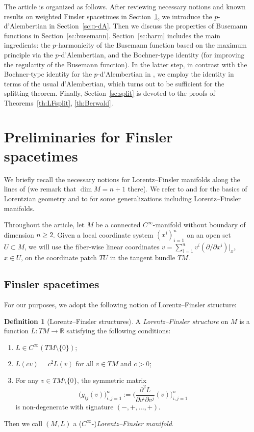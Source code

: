 \documentclass[a4paper,11pt]{article}
\numberwithin{equation}{section}
\theoremstyle{definition}
\newtheorem{definition}{Definition}[section]
\theoremstyle{plain}
\newcommand{\del}{\partial}
\newcommand{\lra}{\longrightarrow}
\newcommand{\R}{\ensuremath{\mathbb{R}}}
\begin{document}
The article is organized as follows.
After reviewing necessary notions and known results on weighted Finsler spacetimes in Section~\ref{sc:pre}, we introduce the $p$-d'Alembertian in Section~\ref{sc:p-dA}.
Then we discuss the properties of Busemann functions in Section~\ref{sc:busemann}. Section~\ref{sc:harm} includes the main ingredients: the $p$-harmonicity of the Busemann function based on the maximum principle via the $p$-d'Alembertian, and the Bochner-type identity (for improving the regularity of the Busemann function).
In the latter step, in contrast with the Bochner-type identity for the $p$-d'Alembertian in \cite{quintet}, we employ the identity in terms of the usual d'Alembertian, which turns out to be sufficient for the splitting theorem.
Finally, Section~\ref{sc:split} is devoted to the proofs of Theorems~\ref{th:LFsplit}, \ref{th:Berwald}.

\section{Preliminaries for Finsler spacetimes}\label{sc:pre}
We briefly recall the necessary notions for Lorentz--Finsler manifolds along the lines of  \cite{LMO1,LMO2,LMO3} 
(we remark that $\dim M=n+1$ there).
We refer to  \cite{O'Neill:1983} and  \cite{BEE:1996} for the basics of Lorentzian geometry and to \cite{Perlic06,Min-cone, Min-Rev, Min-causality, JavSan20} for some generalizations including Lorentz--Finsler manifolds.

Throughout the article,
let $M$ be a connected $C^{\infty}$-manifold without boundary of dimension $n\ge 2$.
Given a local coordinate system $(x^i)_{i=1}^n$ on an open set $U\subset M$,
we will use the fiber-wise linear coordinates
$v =\sum_{i=1}^n v^i (\partial/\partial x^i)|_x,$ $x \in U$, on the coordinate patch $TU$ in the tangent bundle $TM$.

\subsection{Finsler spacetimes}\label{ssc:Finsler}
For our purposes, we adopt the following notion of Lorentz--Finsler structure:
\begin{definition}[Lorentz--Finsler structures]\label{df:LFstr}
A \emph{Lorentz--Finsler structure} on $M$ is a function
$L\colon TM \lra \R$ satisfying the following conditions:
\begin{enumerate}[(1)]
\item $L \in C^{\infty}(TM \setminus \{0\})$;
\item $L(cv)=c^2 L(v)$ for all $v \in TM$ and $c>0$;
\item For any $v \in TM \setminus \{0\}$, the symmetric matrix
\begin{equation}\label{eq:g_ij}
\big( g_{ij}(v) \big)_{i,j=1}^n
 :=\bigg( \frac{\del^2 L}{\del v^i \del v^j}(v) \bigg)_{i,j=1}^n
\end{equation}
is non-degenerate with signature $(-,+,\ldots,+)$.
\end{enumerate}
Then we call $(M,L)$ a ($C^{\infty}$-)\emph{Lorentz--Finsler manifold}.
\end{definition}
\end{document}
